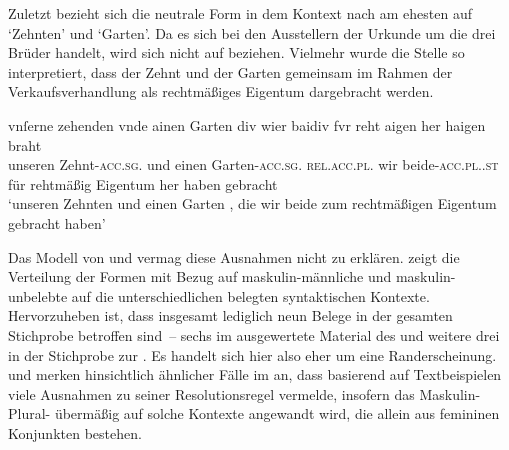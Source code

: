 
Zuletzt bezieht sich die neutrale Form  in 
dem Kontext nach am ehesten auf  `Zehnten' und 
`Garten'. Da es sich bei den Ausstellern der Urkunde um die drei Brüder
\autocites(Nrn.~1201~AB)[472,6--7]{cao2} handelt, wird sich  nicht
auf  beziehen. Vielmehr wurde die Stelle so interpretiert, dass der
Zehnt und der Garten gemeinsam im Rahmen der Verkaufsverhandlung als
rechtmäßiges Eigentum dargebracht werden.

\begin{exe}
\ex \label{ex:m+m_beidiu_5}
	\gll vnſerne zehenden \textelp{} vnde ainen Garten \textelp{} div wier
			baidiv fvr reht aigen her haigen braht \\
		unseren Zehnt-\textsc{acc.sg.\MascI} {} und einen
		Garten-\textsc{acc.sg.\MascI} {} \textsc{rel.acc.pl.\NeutI} wir
		beide-\textsc{acc.pl.\NeutI.st} für rehtmäßig Eigentum her haben
		gebracht \\
	\trans `unseren Zehnten \textelp{} und einen Garten \textelp{}, die wir
		beide zum rechtmäßigen Eigentum gebracht haben'
		\parencites(Nrn.~1201~AB, Kl.~Heiligkreuztal, Kr.~Biberach, 1290)[472,10--14]{cao2}
\end{exe}

Das Modell von \citet{wechsler2009} und \citet{wechslerzlatic2003} vermag diese
Ausnahmen nicht zu erklären.  zeigt die
Verteilung der Formen mit Bezug auf
maskulin-männliche und maskulin-unbelebte  auf die
unterschiedlichen belegten syntaktischen Kontexte. Hervorzuheben ist, dass
insgesamt lediglich neun Belege in der gesamten Stichprobe betroffen sind~--
sechs im ausgewertete Material des \CAO{} und weitere drei in der Stichprobe
zur \KC{}. Es handelt sich hier also eher um eine Randerscheinung.
\citet[581]{wechsler2009} und \citet[190]{wechslerzlatic2003} merken
hinsichtlich ähnlicher Fälle im  an, dass
\citet{corbett1983,corbett1991} basierend auf Textbeispielen viele
Ausnahmen zu seiner Resolutionsregel vermelde, insofern das
Maskulin-Plural- übermäßig auf solche Kontexte angewandt wird, die
allein aus femininen Konjunkten bestehen.

